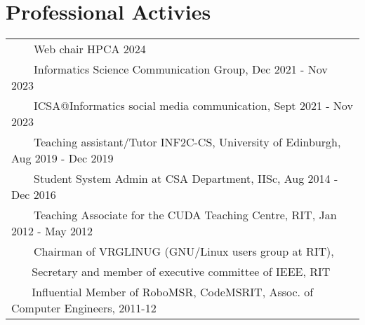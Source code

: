 \documentclass[a4paper,10pt]{article} %
\newcommand{\tabitem}{~~\llap{\textbullet}~~}
\begin{document}
\section{Professional Activies}
\hskip-0.4cm
\begin{tabular}{l}
	\tabitem Web chair HPCA 2024 \\
        \tabitem Informatics Science Communication Group, Dec 2021 - Nov 2023 \\
	\tabitem ICSA@Informatics social media communication, Sept 2021 - Nov 2023 \\
	\tabitem Teaching assistant/Tutor INF2C-CS, University of Edinburgh, Aug 2019 - Dec 2019 \\
	\tabitem Student System Admin at CSA Department, IISc, Aug 2014 - Dec 2016 \\
	\tabitem Teaching Associate for the CUDA Teaching Centre, RIT, Jan 2012 - May 2012 \\
	\tabitem Chairman of VRGLINUG (GNU/Linux users group at RIT), \\
	~~~ Secretary and member of executive committee of IEEE, RIT  \\
	~~~ Influential Member of {\footnotesize RoboMSR, CodeMSRIT, Assoc. of Computer Engineers}, 2011-12 \\
\end{tabular}


\iffalse
\end{document}

